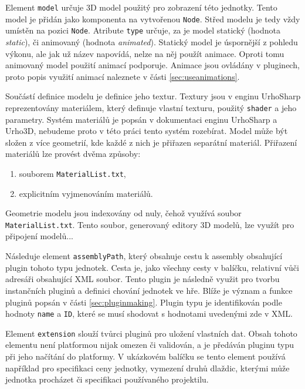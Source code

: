 Element \texttt{model} určuje 3D model použitý pro zobrazení této jednotky. Tento model je přidán jako komponenta na vytvořenou \texttt{Node}. Střed modelu je tedy vždy umístěn na pozici \texttt{Node}. Atribute \texttt{type} určuje, za je model statický (hodnota \textit{static}), či animovaný (hodnota \textit{animated}). Statický model je úspornější z pohledu výkonu, ale jak už název napovídá, nelze na něj použít animace. Oproti tomu animovaný model použití animací podporuje. Animace jsou ovládány v pluginech, proto popis využití animací naleznete v části \ref{sec:useanimations}.

Součástí definice modelu je definice jeho textur. Textury jsou v enginu UrhoSharp reprezentovány materiálem, který definuje vlastní texturu, použitý \texttt{shader} a jeho parametry. Systém materiálů je popsán v dokumentaci enginu UrhoSharp a Urho3D, nebudeme proto v této práci tento systém rozebírat. Model může být složen z více geometrií, kde každé z nich je přiřazen separátní materiál. Přiřazení materiálů lze provést dvěma způsoby:

\begin{enumerate}
	\item souborem \texttt{MaterialList.txt},
	\item explicitním vyjmenováním materiálů.
\end{enumerate}

Geometrie modelu jsou indexovány od nuly, čehož využívá soubor \texttt{MaterialList.txt}. Tento soubor, generovaný editory 3D modelů, lze využít pro připojení modelů...

Následuje element \texttt{assemblyPath}, který obsahuje cestu k assembly obsahující plugin tohoto typu jednotek. Cesta je, jako všechny cesty v balíčku, relativní vůči adresáři obsahující XML soubor. Tento plugin je následně využit pro tvorbu instančních pluginů a definici chování jednotek ve hře. Blíže je význam a funkce pluginů popsán v části \ref{sec:pluginmaking}. Plugin typu je identifikován podle hodnoty \texttt{name} a \texttt{ID}, které se musí shodovat s hodnotami uvedenými zde v XML. 

Element \texttt{extension} slouží tvůrci pluginů pro uložení vlastních dat. Obsah tohoto elementu není platformou nijak omezen či validován, a je předáván pluginu typu při jeho načítání do platformy. V ukázkovém balíčku se tento element používá například pro specifikaci ceny jednotky, vymezení druhů dlaždic, kterými může jednotka procházet či specifikaci používaného projektilu.

